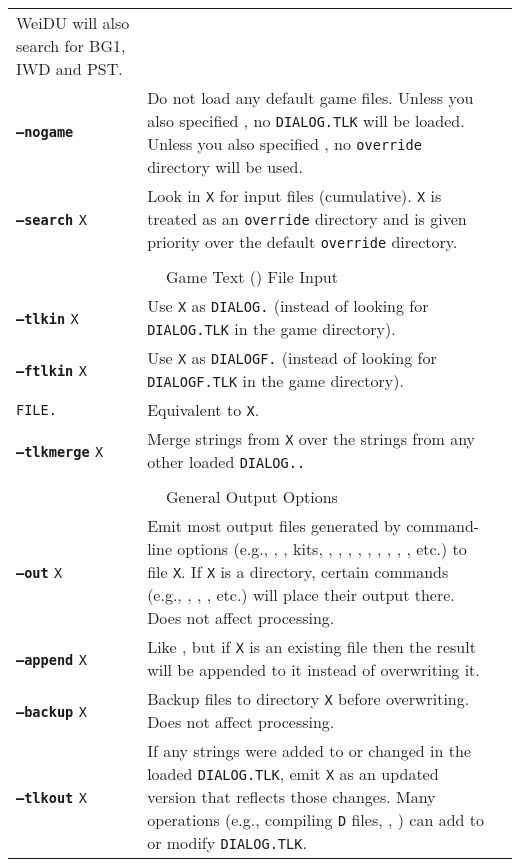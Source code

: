 \documentclass{article}
\def\ttref#1{\ahrefloc{#1}{\tt #1}}
\def\DEFINE#1{{\tt \bf #1}\label{#1}\index{#1}}
\def\t#1{{\tt #1}}
\begin{document}
\begin{tabular}{lp{10in}|p{10in}}
WeiDU will also search for BG1, IWD and PST. \\ \DEFINE{--nogame}  & Do not
load any default game files. Unless you also specified \ttref{--tlkin}, no
\t{DIALOG.TLK} will be loaded. Unless you also specified \ttref{--search},
no \t{override} directory will be used. \\
\DEFINE{--search} \t{X}	& Look in {\tt X} for input files (cumulative).
\t{X} is treated as an \t{override} directory and is given priority over 
the default \t{override} directory. \\
\\
\multicolumn{2}{c}{ \color{red} Game Text (\ttref{TLK}) File Input} \\
\DEFINE{--tlkin} \t{X}	& Use {\tt X} as {\tt DIALOG.}\ttref{TLK} (instead
of looking for \t{DIALOG.TLK} in the game directory). \\
\DEFINE{--ftlkin} \t{X} & Use {\tt X} as {\tt DIALOGF.}\ttref{TLK} (instead
of looking for \t{DIALOGF.TLK} in the game directory). \\
\tt{FILE.}\ttref{TLK} & Equivalent to \ttref{--tlkin} \t{X}. \\
\DEFINE{--tlkmerge} \t{X}	& Merge strings from {\tt X} over the strings from any other loaded {\tt \t{DIALOG.}\ttref{TLK}.} \\
\\
\multicolumn{2}{c}{ \color{red} General Output Options} \\
\DEFINE{--out} \t{X} &	Emit most output files generated by command-line
options (e.g., \ttref{D}, \ttref{DLG}, kits, \ttref{--biff-get},
\ttref{BAF}, \ttref{BCS}, \ttref{--automate}, \ttref{--traify-tlk},
\ttref{--extract-kits}, \ttref{--list-biff}, \ttref{--cmp-from},
\ttref{--dcmp-from}, etc.) to file {\tt X}. If \t{X} is a directory,
certain commands (e.g., \ttref{D}, \ttref{DLG}, \ttref{--biff-get}, etc.)
will place their output there.  Does not affect \ttref{TP2} processing. \\
\DEFINE{--append} \t{X} & Like \ttref{--out}, but if \t{X} is an existing
file then the result will be appended to it instead of overwriting it. \\
\DEFINE{--backup} \t{X} &	Backup files to directory {\tt X} before overwriting. Does not affect \ttref{TP2} processing. \\
\DEFINE{--tlkout} \t{X} &	If any strings were added to or changed in the loaded \t{DIALOG.TLK}, emit \t{X} as an updated version that reflects those changes. Many operations (e.g., compiling \t{D} files, \ttref{--tlkmerge}, \ttref{STRING!SET}) can add to or modify \t{DIALOG.TLK}. \\

\end{tabular}
\end{document}
